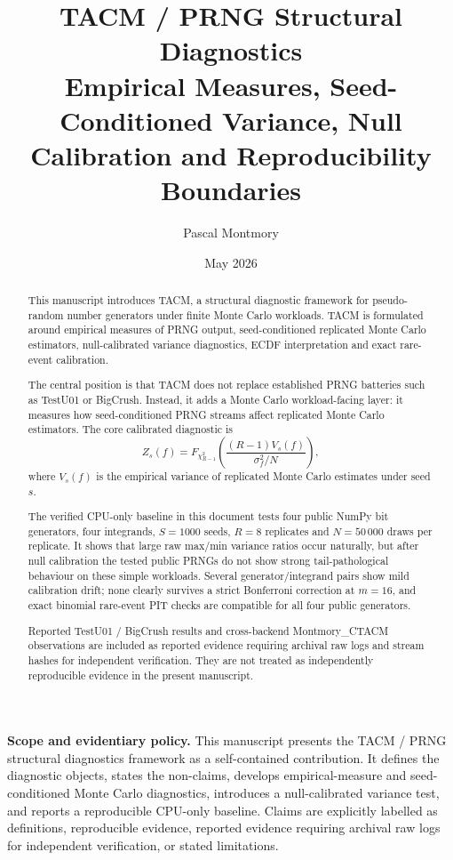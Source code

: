 \documentclass[11pt,a4paper]{article}
\title{\textbf{TACM / PRNG Structural Diagnostics}\\
\large Empirical Measures, Seed-Conditioned Variance, Null Calibration and Reproducibility Boundaries}
\author{Pascal Montmory}
\date{May 2026}
\begin{document}
\maketitle

\noindent\textbf{Scope and evidentiary policy.} This manuscript presents the TACM / PRNG structural diagnostics framework as a self-contained contribution. It defines the diagnostic objects, states the non-claims, develops empirical-measure and seed-conditioned Monte Carlo diagnostics, introduces a null-calibrated variance test, and reports a reproducible CPU-only baseline. Claims are explicitly labelled as definitions, reproducible evidence, reported evidence requiring archival raw logs for independent verification, or stated limitations.

\begin{abstract}
This manuscript introduces TACM, a structural diagnostic framework for pseudo-random number generators under finite Monte Carlo workloads. TACM is formulated around empirical measures of PRNG output, seed-conditioned replicated Monte Carlo estimators, null-calibrated variance diagnostics, ECDF interpretation and exact rare-event calibration.

The central position is that TACM does not replace established PRNG batteries such as TestU01 or BigCrush. Instead, it adds a Monte Carlo workload-facing layer: it measures how seed-conditioned PRNG streams affect replicated Monte Carlo estimators. The core calibrated diagnostic is
\[
Z_s(f)=F_{\chi^2_{R-1}}
\left(
\frac{(R-1)V_s(f)}{\sigma_f^2/N}
\right),
\]
where $V_s(f)$ is the empirical variance of replicated Monte Carlo estimates under seed $s$.

The verified CPU-only baseline in this document tests four public NumPy bit generators, four integrands, $S=1000$ seeds, $R=8$ replicates and $N=50\,000$ draws per replicate. It shows that large raw max/min variance ratios occur naturally, but after null calibration the tested public PRNGs do not show strong tail-pathological behaviour on these simple workloads. Several generator/integrand pairs show mild calibration drift; none clearly survives a strict Bonferroni correction at $m=16$, and exact binomial rare-event PIT checks are compatible for all four public generators.

Reported TestU01 / BigCrush results and cross-backend Montmory\_CTACM observations are included as reported evidence requiring archival raw logs and stream hashes for independent verification. They are not treated as independently reproducible evidence in the present manuscript.
\end{abstract}
\end{document}
